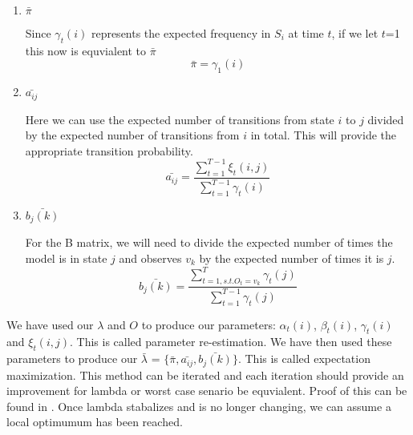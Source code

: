     \begin{enumerate}[i]
        \label{Hidden_Markov:Learning:Baum_Welch:Reestimation}
        \item $\bar{\pi}$ 
        
        Since $\gamma_t(i)$ represents the expected frequency in $S_i$ at time $t$, if we let $t$=1 this now is equvialent to $\bar{\pi}$
        \begin{equation}
            \bar{\pi} = \gamma_1(i)
        \end{equation}

        \item $\bar{a_{ij}}$
        
        Here we can use the expected number of transitions from state $i$ to $j$ divided by the expected number of transitions from $i$ in total. This will provide the appropriate transition probability. 
        \begin{equation}
            \bar{a_{ij}} = \dfrac{\sum_{t=1}^{T-1} \xi_t(i,j)}{\sum_{t=1}^{T-1} \gamma_t(i)}
        \end{equation}

        \item $\bar{b_j(k)}$
        
        For the B matrix, we will need to divide the expected number of times the model is in state $j$ and observes $v_k$ by the expected number of times it is $j$.
        \begin{equation}
            \bar{b_j(k)} = \dfrac{\sum_{t=1, s.t. O_t = v_k}^T \gamma_t(j)}{\sum_{t=1}^{T-1} \gamma_t(j)}
        \end{equation} 
    \end{enumerate}

    We have used our $\lambda$ and $O$ to produce our parameters: $\alpha_t(i)$, $\beta_t(i)$, $\gamma_t(i)$ and $\xi_t(i,j)$. This is called parameter re-estimation. We have then used these parameters to produce our $\bar{\lambda}$ = $\{\bar{\pi}, \bar{a_{ij}}, \bar{b_j(k)} \}$. This is called expectation maximization. This method can be iterated and each iteration should provide an improvement for lambda or worst case senario be equvialent. Proof of this can be found in \cite{Baum}.  Once lambda stabalizes and is no longer changing, we can assume a local optimumum has been reached. 

